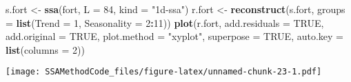 \documentclass[
]{article}
\newenvironment{Shaded}{\begin{snugshade}}{\end{snugshade}}
\newcommand{\AttributeTok}[1]{\textcolor[rgb]{0.13,0.29,0.53}{#1}}
\newcommand{\ConstantTok}[1]{\textcolor[rgb]{0.56,0.35,0.01}{#1}}
\newcommand{\DecValTok}[1]{\textcolor[rgb]{0.00,0.00,0.81}{#1}}
\newcommand{\FunctionTok}[1]{\textcolor[rgb]{0.13,0.29,0.53}{\textbf{#1}}}
\newcommand{\NormalTok}[1]{#1}
\newcommand{\OtherTok}[1]{\textcolor[rgb]{0.56,0.35,0.01}{#1}}
\newcommand{\SpecialCharTok}[1]{\textcolor[rgb]{0.81,0.36,0.00}{\textbf{#1}}}
\newcommand{\StringTok}[1]{\textcolor[rgb]{0.31,0.60,0.02}{#1}}
\begin{document}
\begin{Shaded}
\begin{Highlighting}[]
\NormalTok{s.fort }\OtherTok{\textless{}{-}} \FunctionTok{ssa}\NormalTok{(fort, }\AttributeTok{L =} \DecValTok{84}\NormalTok{, }\AttributeTok{kind =} \StringTok{"1d{-}ssa"}\NormalTok{)}
\NormalTok{r.fort }\OtherTok{\textless{}{-}} \FunctionTok{reconstruct}\NormalTok{(s.fort, }
                      \AttributeTok{groups =} \FunctionTok{list}\NormalTok{(}\AttributeTok{Trend =} \DecValTok{1}\NormalTok{,}
                                    \AttributeTok{Seasonality =} \DecValTok{2}\SpecialCharTok{:}\DecValTok{11}\NormalTok{))}
\FunctionTok{plot}\NormalTok{(r.fort, }\AttributeTok{add.residuals =} \ConstantTok{TRUE}\NormalTok{, }\AttributeTok{add.original =} \ConstantTok{TRUE}\NormalTok{,}
     \AttributeTok{plot.method =} \StringTok{"xyplot"}\NormalTok{,}
     \AttributeTok{superpose =} \ConstantTok{TRUE}\NormalTok{, }\AttributeTok{auto.key =} \FunctionTok{list}\NormalTok{(}\AttributeTok{columns =} \DecValTok{2}\NormalTok{))}
\end{Highlighting}
\end{Shaded}

\texttt{[image: SSAMethodCode\_files/figure-latex/unnamed-chunk-23-1.pdf]}
\end{document}
